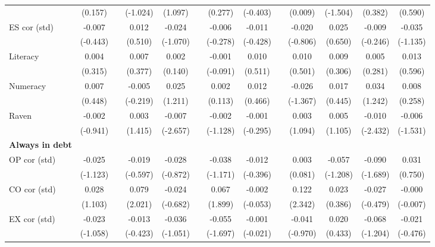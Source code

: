 \begin{table}[htbp]
{\begin{tabular}{lcccccccccccc}
          & (0.157) &       & (-1.024) & (1.097) &       & (0.277) & (-0.403) &       & (0.009) & (-1.504) & (0.382) & (0.590) \\
    ES cor (std) & -0.007 &       & 0.012 & -0.024 &       & -0.006 & -0.011 &       & -0.020 & 0.025 & -0.009 & -0.035 \\
          & (-0.443) &       & (0.510) & (-1.070) &       & (-0.278) & (-0.428) &       & (-0.806) & (0.650) & (-0.246) & (-1.135) \\
    Literacy & 0.004 &       & 0.007 & 0.002 &       & -0.001 & 0.010 &       & 0.010 & 0.009 & 0.005 & 0.013 \\
          & (0.315) &       & (0.377) & (0.140) &       & (-0.091) & (0.511) &       & (0.501) & (0.306) & (0.281) & (0.596) \\
    Numeracy & 0.007 &       & -0.005 & 0.025 &       & 0.002 & 0.012 &       & -0.026 & 0.017 & 0.034 & 0.008 \\
          & (0.448) &       & (-0.219) & (1.211) &       & (0.113) & (0.466) &       & (-1.367) & (0.445) & (1.242) & (0.258) \\
    Raven & -0.002 &       & 0.003 & -0.007 &       & -0.002 & -0.001 &       & 0.003 & 0.005 & -0.010 & -0.006 \\
          & (-0.941) &       & (1.415) & (-2.657) &       & (-1.128) & (-0.295) &       & (1.094) & (1.105) & (-2.432) & (-1.531) \\
    \midrule
    \textbf{Always in debt} &       &       &       &       &       &       &       &       &       &       &       &  \\
    OP cor (std) & -0.025 &       & -0.019 & -0.028 &       & -0.038 & -0.012 &       & 0.003 & -0.057 & -0.090 & 0.031 \\
          & (-1.123) &       & (-0.597) & (-0.872) &       & (-1.171) & (-0.396) &       & (0.081) & (-1.208) & (-1.689) & (0.750) \\
    CO cor (std) & 0.028 &       & 0.079 & -0.024 &       & 0.067 & -0.002 &       & 0.122 & 0.023 & -0.027 & -0.000 \\
          & (1.103) &       & (2.021) & (-0.682) &       & (1.899) & (-0.053) &       & (2.342) & (0.386) & (-0.479) & (-0.007) \\
    EX cor (std) & -0.023 &       & -0.013 & -0.036 &       & -0.055 & -0.001 &       & -0.041 & 0.020 & -0.068 & -0.021 \\
          & (-1.058) &       & (-0.423) & (-1.051) &       & (-1.697) & (-0.021) &       & (-0.970) & (0.433) & (-1.204) & (-0.476) \\

\end{tabular}}
\end{table}
